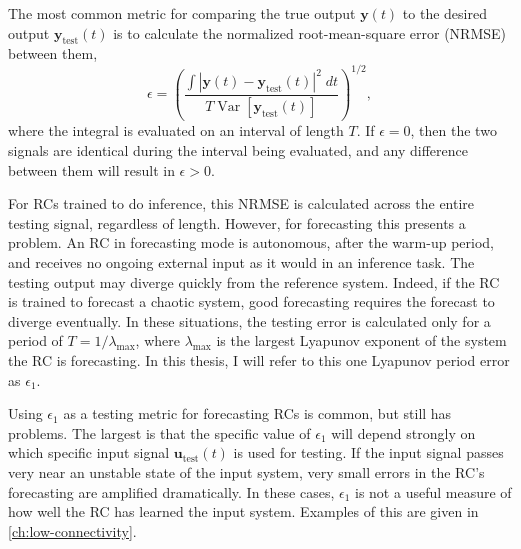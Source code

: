 The most common metric for comparing the true output $\bm{y}(t)$ to
the desired output $\bm{y}_\text{test}(t)$ is to calculate the
normalized root-mean-square error (NRMSE) between them,
\begin{equation}
  \label{eq:nrmse}
  \epsilon = {\left(\frac{\int \left| \mathbf{y}(t) - \mathbf{y}_\text{test}(t) \right|^2 \;dt}{T \operatorname{Var}\left[\bm{y}_\text{test}(t)\right]}\right)}^{1/2},
\end{equation}
where the integral is evaluated on an interval of length $T$.
If $\epsilon = 0$, then the two signals are identical during the
interval being evaluated, and any difference between them will result
in $\epsilon > 0$.

For RCs trained to do inference, this NRMSE is calculated across the
entire testing signal, regardless of length. However, for forecasting
this presents a problem. An RC in forecasting mode is autonomous,
after the warm-up period, and receives no ongoing external input as it
would in an inference task. The testing output may diverge quickly
from the reference system. Indeed, if the RC is trained to forecast a
chaotic system, good forecasting requires the forecast to diverge
eventually. In these situations, the testing error is calculated only
for a period of $T = 1/\lambda_\text{max}$, where $\lambda_\text{max}$
is the largest Lyapunov exponent of the system the RC is
forecasting. In this thesis, I will refer to this one Lyapunov period
error as $\epsilon_1$.

Using $\epsilon_1$ as a testing metric for forecasting RCs is common,
but still has problems.\cite{pathak2017,haluszczynski2019} The largest is that the specific value of
$\epsilon_1$ will depend strongly on which specific input signal
$\bm{u}_\text{test}(t)$ is used for testing. If the input signal
passes very near an unstable state of the input system, very small
errors in the RC's forecasting are amplified dramatically. In these
cases, $\epsilon_1$ is not a useful measure of how well the RC has
learned the input system. Examples of this are given in
\cref{ch:low-connectivity}.

